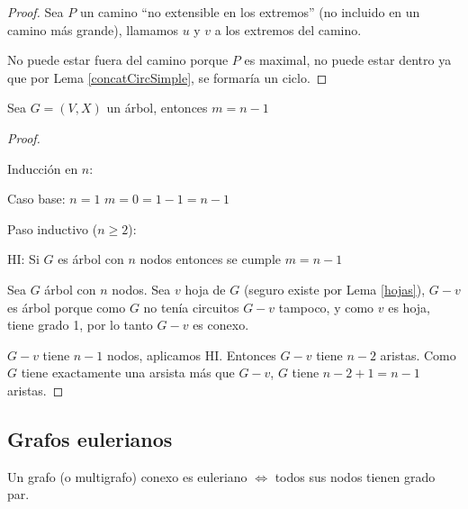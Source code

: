 \begin{proof}
    Sea $P$ un camino ``no extensible en los extremos'' (no incluido en un camino más grande), llamamos $u$ y $v$ a los extremos del camino.

    No puede estar fuera del camino porque $P$ es maximal, no puede estar dentro ya que por Lema \ref{concatCircSimple}, se formaría un ciclo.
\end{proof}

\begin{lema}
    Sea $G = (V, X)$ un árbol, entonces $m = n - 1$
\end{lema}

\begin{proof}
    ~

    Inducción en $n$:

    Caso base: $n = 1$ $m = 0 = 1 - 1 = n - 1$

    Paso inductivo ($n \geq 2$):

    HI: Si $G$ es árbol con $n$ nodos entonces se cumple $m = n - 1$

    Sea $G$ árbol con $n$ nodos. Sea $v$ hoja de $G$ (seguro existe por Lema \ref{hojas}), $G - v$ es árbol porque como $G$ no tenía circuitos $G - v$ tampoco, y como $v$ es hoja, tiene grado 1, por lo tanto $G - v$ es conexo.

    $G - v$ tiene $n - 1$ nodos, aplicamos HI. Entonces $G - v$ tiene $n - 2$ aristas. Como $G$ tiene exactamente una arsista más que $G - v$, $G$ tiene $n - 2 + 1 = n - 1$ aristas.
\end{proof}

\subsection{Grafos eulerianos}

\begin{teo}
    Un grafo (o multigrafo) conexo es euleriano $\Longleftrightarrow$ todos sus nodos tienen grado par.
\end{teo}

